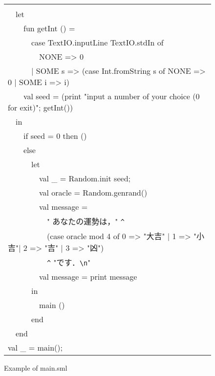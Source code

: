 \documentclass{jbook}
\newcommand{\myem}{\mbox{\ \ }}
\newenvironment{program}{\begin{quote}\begin{tt}}%
                        {\end{tt}\end{quote}}
\begin{document}
\begin{figure}[b]
\begin{center}
\begin{tabular}{l}
\begin{minipage}{0.9\textwidth}
\begin{program}
fun main() =\\
\myem  let\\
\myem\myem    fun getInt () = \\
\myem\myem\myem        case TextIO.inputLine TextIO.stdIn of\\
\myem\myem\myem\ \       NONE => 0\\
\myem\myem\myem        | SOME s => (case Int.fromString s of NONE => 0 | SOME i => i)\\
\myem\myem    val seed = (print "input a number of your choice (0 for exit)";  getInt())\\
\myem  in\\
\myem\myem    if seed = 0 then ()\\
\myem\myem    else\\
\myem\myem\myem      let\\
\myem\myem\myem\myem        val \_ = Random.init seed;\\
\myem\myem\myem\myem        val oracle = Random.genrand()\\
\myem\myem\myem\myem        val message = \\
\myem\myem\myem\myem\myem            " あなたの運勢は，" \verb|^|\\
\myem\myem\myem\myem\myem            (case oracle mod 4 of 0 => "大吉" | 1 => "小吉"| 2 => "吉" | 3 => "凶")\\
\myem\myem\myem\myem\myem            \verb|^| "です．\verb|\n|"\\
\myem\myem\myem\myem        val message = print message\\
\myem\myem\myem      in\\
\myem\myem\myem\myem        main ()\\
\myem\myem\myem      end\\
\myem  end\\
val \_ = main();
\end{program}
\end{minipage}
\end{tabular}
\caption{Example of main.sml}
\label{fig:main}
\end{center}
\end{figure}
\fi%
	
\end{document}
